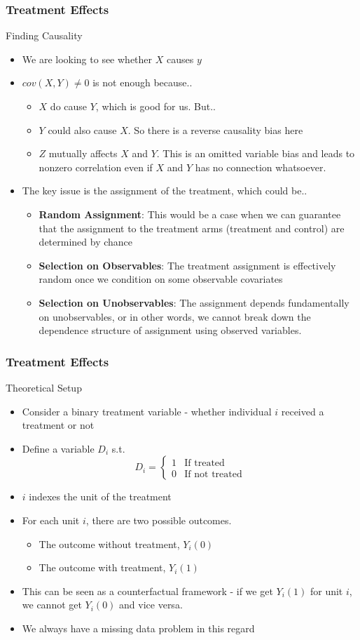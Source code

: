 \documentclass{beamer}
\begin{document}
\begin{frame}
\frametitle{Treatment Effects}
Finding Causality
\begin{itemize}
\item We are looking to see whether $X$ causes $y$
\item $cov(X,Y)\neq 0$ is not enough because..
\begin{itemize}
\item $X$ do cause $Y$, which is good for us. But..
\item $Y$ could also cause $X$. So there is a reverse causality bias here
\item $Z$ mutually affects $X$ and $Y$. This is an omitted variable bias and leads to nonzero correlation even if $X$ and $Y$ has no connection whatsoever. 
\end{itemize} 
\item The key issue is the assignment of the treatment, which could be..
\begin{itemize}
\item \textbf{Random Assignment}: This would be a case when we can guarantee that the assignment to the treatment arms (treatment and control) are determined by chance
\item \textbf{Selection on Observables}: The treatment assignment is effectively random once we condition on some observable covariates
\item \textbf{Selection on Unobservables}: The assignment depends fundamentally on unobservables, or in other words, we cannot break down the dependence structure of assignment using observed variables. 
\end{itemize}
\end{itemize}
\end{frame}

\begin{frame}
\frametitle{Treatment Effects}
Theoretical Setup
\begin{itemize}
\item Consider a binary treatment variable - whether individual $i$ received a treatment or not
\item  Define a variable $D_i$ s.t.
\[
D_i = \begin{cases} 1 & \text{If treated} \\ 0 & \text{If not treated}\end{cases}
\]
\item $i$ indexes the unit of the treatment
\item For each unit $i$, there are two possible outcomes. 
\begin{itemize}
\item The outcome without treatment,  $Y_i(0)$
\item The outcome with treatment, $Y_i(1)$
\end{itemize}
\item This can be seen as a counterfactual framework - if we get $Y_i(1)$ for unit $i$, we cannot get $Y_i(0)$ and vice versa. 
\item We always have a missing data problem in this regard
\end{itemize}
\end{frame}
\end{document}

